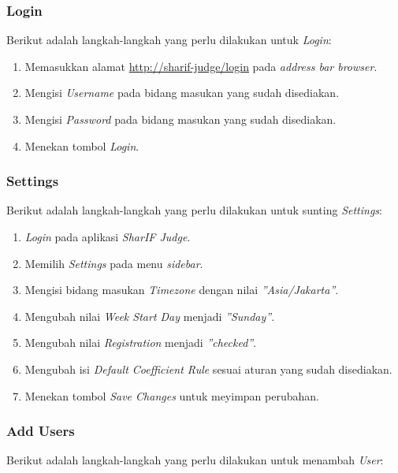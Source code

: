 \subsubsection{Login}
\label{subsubsec:skenario_login}
Berikut adalah langkah-langkah yang perlu dilakukan untuk \textit{Login}:

\begin{enumerate}
	\item Memasukkan alamat \url{http://sharif-judge/login} pada \textit{address bar browser}.
	\item Mengisi \textit{Username} pada bidang masukan yang sudah disediakan.
	\item Mengisi \textit{Password} pada bidang masukan yang sudah disediakan.
	\item Menekan tombol \textit{Login}.
\end{enumerate}

\subsubsection{Settings}
\label{subsubsec:skenario_settings}
Berikut adalah langkah-langkah yang perlu dilakukan untuk sunting \textit{Settings}:

\begin{enumerate}
	\item \textit{Login} pada aplikasi \textit{SharIF Judge}.
	\item Memilih \textit{Settings} pada menu \textit{sidebar}.
	\item Mengisi bidang masukan \textit{Timezone} dengan nilai \textit{''Asia/Jakarta''}.
	\item Mengubah nilai \textit{Week Start Day} menjadi \textit{''Sunday''}.
	\item Mengubah nilai \textit{Registration} menjadi \textit{''checked''}.
	\item Mengubah isi \textit{Default Coefficient Rule} sesuai aturan yang sudah disediakan.
	\item Menekan tombol \textit{Save Changes} untuk meyimpan perubahan.
\end{enumerate}

\subsubsection{Add Users}
\label{subsubsec:skenario_add_users}
Berikut adalah langkah-langkah yang perlu dilakukan untuk menambah \textit{User}:


